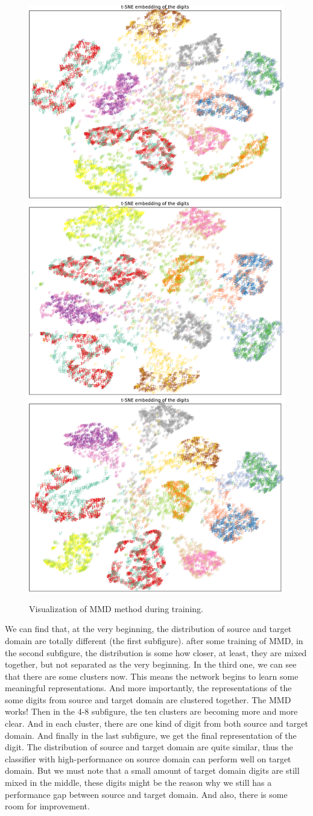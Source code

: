 \documentclass{article} %
\begin{document}
\begin{figure}[h]
\includegraphics[width=0.32\linewidth]{figs/mmd-26700emb-st}
\includegraphics[width=0.32\linewidth]{figs/mmd-32700emb-st}
\includegraphics[width=0.32\linewidth]{figs/mmd-37000emb-st}

\caption{Visualization of MMD method during training.}
\label{ref:mmd-training}
\end{figure}
We can find that, at the very beginning, the distribution of source and target domain are totally different (the first subfigure). after some training of MMD, in the second subfigure, the distribution is some how closer, at least, they are mixed together, but not separated as the very beginning. In the third one, we can see that there are some clusters now. This means the network begins to learn some meaningful representations. And more importantly, the representations of the some digits from source and target domain are clustered together. The MMD works!  Then in the 4-8 subfigure, the ten clusters are becoming more and more clear. And in each cluster, there are one kind of digit from both source and target domain. And finally in the last subfigure, we get the final representation of the digit. The distribution of source and target domain are quite similar, thus the classifier with high-performance on source domain can perform well on target domain. But we must note that a small amount of target domain digits are still mixed in the middle, these digits might be the reason why we still has a performance gap between source and target domain. And also, there is some room for improvement. 
\end{document}
